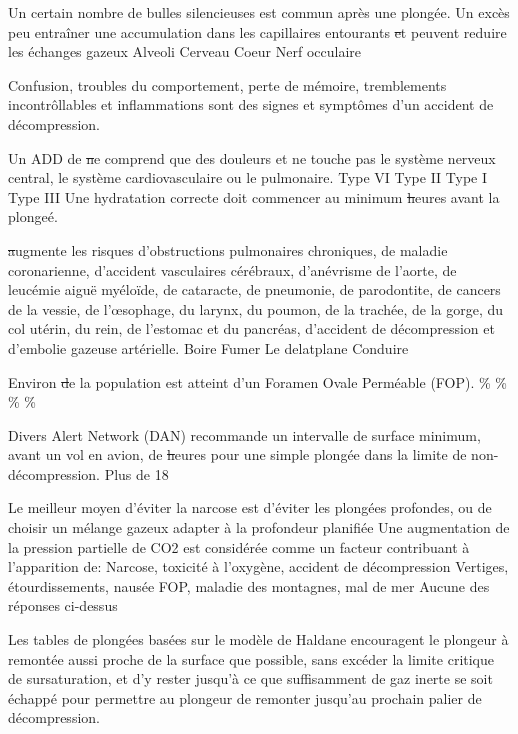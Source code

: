 \documentclass[english,10pt,twoside]{article}
\begin{document}
\begin{outline}
		\1 Un certain nombre de bulles silencieuses est commun après une plongée. Un excès peu entraîner une accumulation dans les capillaires entourants \st et peuvent reduire les échanges gazeux
			\2 Alveoli
			\2 Cerveau
			\2 Coeur
			\2 Nerf occulaire

		\1 Confusion, troubles du comportement, perte de mémoire, tremblements incontrôllables et inflammations sont des signes et symptômes d'un accident de décompression.\vf

		\1 Un ADD de \st ne comprend que des douleurs et ne touche pas le système nerveux central, le système cardiovasculaire ou le pulmonaire.
			\2 Type VI
			\2 Type II
			\2 Type I
			\2 Type III
		\1 Une hydratation correcte doit commencer au minimum	\st heures avant la plongeé.

		\1 \st augmente les risques d'obstructions pulmonaires chroniques, de maladie coronarienne, d'accident vasculaires cérébraux, d'anévrisme de l'aorte, de leucémie aiguë myéloïde, de cataracte, de pneumonie, de parodontite, de cancers de la vessie, de l'œsophage, du larynx, du poumon, de la trachée, de la gorge, du col utérin, du rein, de l'estomac et du pancréas, d'accident de décompression et d'embolie gazeuse artérielle.
			\2 Boire
			\2 Fumer
			\2 Le delatplane
			\2 Conduire

		\1 Environ \st de la population est atteint d'un Foramen Ovale Perméable (FOP).
			\%
			\%
			\%
			\%

		\1 Divers Alert Network (DAN) recommande un intervalle de surface minimum, avant un vol en avion, de \st heures pour une simple plongée dans la limite de non-décompression.
			\2 Plus de 18
			\2 18

		\1 Le meilleur moyen d'éviter la narcose est d'éviter les plongées profondes, ou de choisir un mélange gazeux adapter à la profondeur planifiée\vf	
		\1 Une augmentation de la pression partielle de CO2 est considérée comme un facteur contribuant à l'apparition de:
			\2 Narcose, toxicité à l'oxygène, accident de décompression
			\2 Vertiges, étourdissements, nausée
			\2 FOP, maladie des montagnes, mal de mer
			\2 Aucune des réponses ci-dessus

		\1 Les tables de plongées basées sur le modèle de Haldane encouragent le plongeur à remontée aussi proche de la surface que possible, sans excéder la limite critique de sursaturation, et d'y rester jusqu'à ce que suffisamment de gaz inerte se soit échappé pour permettre au plongeur de remonter jusqu'au prochain palier de décompression.\vf



\end{outline}
\end{document}
